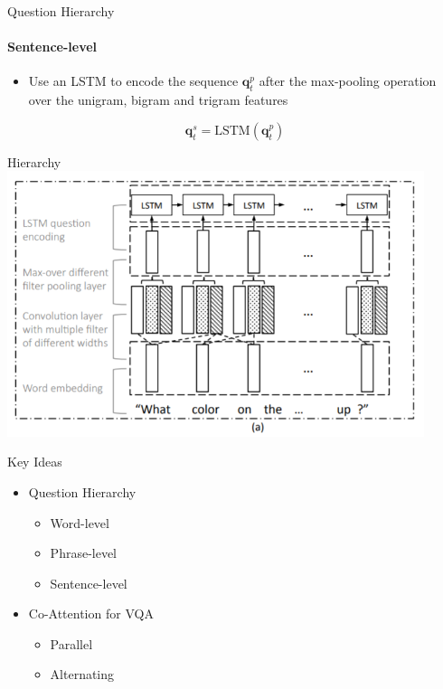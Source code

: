 \documentclass{beamer}
\begin{document}
\begin{frame}{Question Hierarchy}
  \framesubtitle{Sentence-level}  
  
  \begin{itemize}
      \item Use an LSTM to encode the sequence $\mathbf{q}^p_t$ after the max-pooling operation over the unigram, bigram and trigram features
  \end{itemize}
  
  \begin{equation*}
      \mathbf{q}^s_t = \text{LSTM}(\mathbf{q}^p_t)
  \end{equation*}

\end{frame}

\begin{frame}{Hierarchy}
\includegraphics[width=12.2cm]{Annotation 2020-02-09 152111.png}
\end{frame}

\begin{frame}{Key Ideas}
\begin{itemize}
\item \color{gray} Question Hierarchy
\begin{itemize}
    \item \color{gray} Word-level
    \item Phrase-level
    \item Sentence-level
\end{itemize}
\item \color{black} Co-Attention for VQA
\begin{itemize}
    \item Parallel 
    \item \color{black} Alternating 
\end{itemize}
\end{itemize}
\end{frame}
\end{document}
